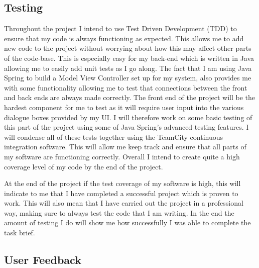 \subsection{Testing}

Throughout the project I intend to use Test Driven Development (TDD) to ensure that my code is always functioning as expected. This allows me to add new code to the project without worrying about how this may affect other parts of the code-base. This is especially easy for my back-end which is written in Java allowing me to easily add unit tests as I go along. The fact that I am using Java Spring to build a Model View Controller set up for my system, also provides me with some functionality allowing me to test that connections between the front and back ends are always made correctly. The front end of the project will be the hardest component for me to test as it will require user input into the various dialogue boxes provided by my UI. I will therefore work on some basic testing of this part of the project using some of Java Spring's advanced testing features. I will condense all of these tests together using the TeamCity continuous integration software. This will allow me keep track and ensure that all parts of my software are functioning correctly. Overall I intend to create quite a high coverage level of my code by the end of the project. 

At the end of the project if the test coverage of my software is high, this will indicate to me that I have completed a successful project which is proven to work. This will also mean that I have carried out the project in a professional way, making sure to always test the code that I am writing. In the end the amount of testing I do will show me how successfully I was able to complete the task brief.

\subsection{User Feedback}

